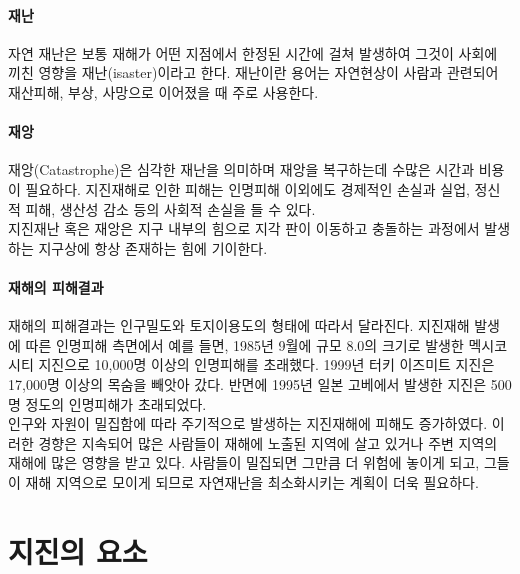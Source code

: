 \documentclass[12pt, a4paper, oneside]{book}
\begin{document}
	\paragraph{재난}
	자연 재난은 보통 재해가 어떤 지점에서 한정된 시간에 걸쳐 발생하여 그것이 사회에 끼친 영향을 재난(isaster)이라고 한다.
	재난이란 용어는 자연현상이 사람과 관련되어 재산피해, 부상, 사망으로 이어졌을 때 주로 사용한다.

	\paragraph{재앙}
	재앙(Catastrophe)은 심각한 재난을 의미하며 재앙을 복구하는데 수많은 시간과 비용이 필요하다.
	지진재해로 인한 피해는 인명피해 이외에도 경제적인 손실과 실업, 정신적 피해, 생산성 감소 등의 사회적 손실을 들 수 있다. \\
	
	지진재난 혹은 재앙은 지구 내부의 힘으로 지각 판이 이동하고 충돌하는 과정에서 발생하는 지구상에 항상 존재하는 힘에 기이한다. \\
	
	
	\paragraph{재해의 피해결과}
	재해의 피해결과는 인구밀도와 토지이용도의 형태에 따라서 달라진다.
	지진재해 발생에 따른 인명피해 측면에서 예를 들면, 1985년 9월에 규모 8.0의 크기로 발생한 멕시코 시티 지진으로 10,000명 이상의 인명피해를 초래했다.
	1999년 터키 이즈미트 지진은 17,000명 이상의 목숨을 빼앗아 갔다.
	반면에 1995년 일본 고베에서 발생한 지진은 500명 정도의 인명피해가 초래되었다. \\
	
	인구와 자원이 밀집함에 따라 주기적으로 발생하는 지진재해에 피해도 증가하였다.
	이러한 경향은 지속되어 많은 사람들이 재해에 노출된 지역에 살고 있거나 주변 지역의 재해에 많은 영향을 받고 있다.
	사람들이 밀집되면 그만큼 더 위험에 놓이게 되고, 그들이 재해 지역으로 모이게 되므로 자연재난을 최소화시키는 계획이 더욱 필요하다.
	
	
	
	
	
	
	
	
	


	\clearpage
	\section{지진의 요소}
\end{document}

